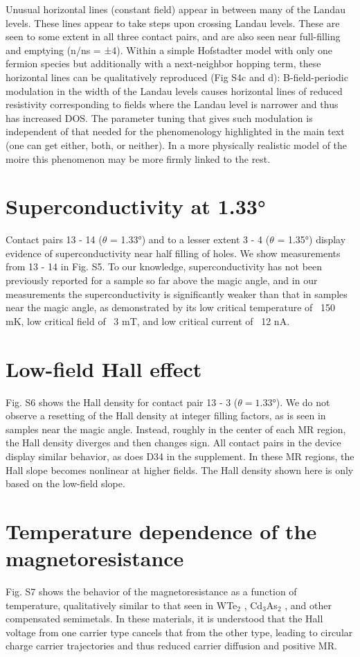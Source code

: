 \documentclass[12pt,twocolumn]{article}
\begin{document}
Unusual horizontal lines (constant field) appear in between many of the Landau levels. These lines appear to take steps upon crossing Landau levels. These are seen to some extent in all three contact pairs, and are also seen near full-filling and emptying (n/ns = ±4). Within a simple Hofstadter model with only one fermion species but additionally with a next-neighbor hopping term, these horizontal lines can be qualitatively reproduced (Fig S4c and d):  B-field-periodic modulation in the width of the Landau levels causes horizontal lines of reduced resistivity corresponding to fields where the Landau level is narrower and thus has increased DOS. The parameter tuning that gives such modulation is independent of that needed for the phenomenology highlighted in the main text (one can get either, both, or neither). In a more physically realistic model of the moire this phenomenon may be more firmly linked to the rest.

\section{Superconductivity at 1.33°}
Contact pairs 13 - 14 ($\theta$ = 1.33°) and to a lesser extent 3 - 4 ($\theta$ = 1.35°) display evidence of superconductivity near half filling of holes. We show measurements from 13 - 14 in Fig. S5. To our knowledge, superconductivity has not been previously reported for a sample so far above the magic angle, and in our measurements the superconductivity is significantly weaker than that in samples near the magic angle, as demonstrated by its low critical temperature of ~150 mK, low critical field of ~3 mT, and low critical current of ~12 nA.

\section{Low-field Hall effect}
Fig. S6 shows the Hall density for contact pair 13 - 3 ($\theta = 1.33°$). We do not observe a resetting of the Hall density at integer filling factors, as is seen in samples near the magic angle. Instead, roughly in the center of each MR region, the Hall density diverges and then changes sign. All contact pairs in the device display similar behavior, as does D34 in the supplement. In these MR regions, the Hall slope becomes nonlinear at higher fields. The Hall density shown here is only based on the low-field slope.

\section{Temperature dependence of the magnetoresistance}
Fig. S7 shows the behavior of the magnetoresistance as a function of temperature, qualitatively similar to that seen in WTe$_2$ \cite{aliLargeNonsaturatingMagnetoresistance2014,fatemiMagnetoresistanceQuantumOscillations2017}, Cd$_3$As$_2$ \cite{liangUltrahighMobilityGiant2015}, and other compensated semimetals. In these materials, it is understood that the Hall voltage from one carrier type cancels that from the other type, leading to circular charge carrier trajectories and thus reduced carrier diffusion and positive MR.
\end{document}
